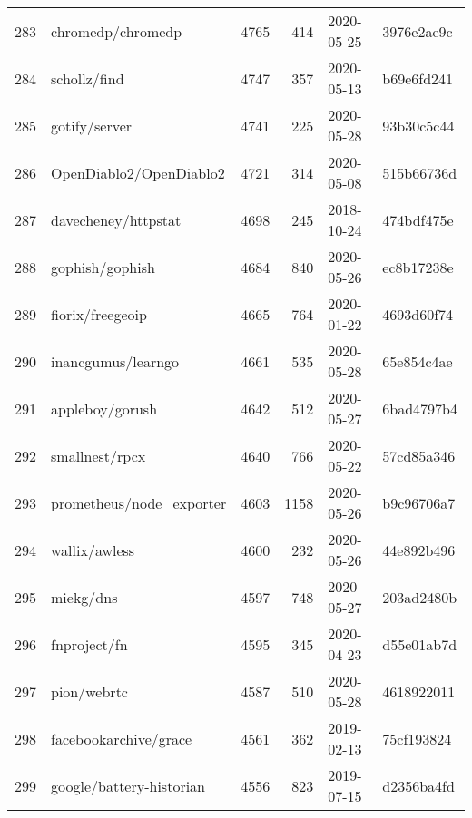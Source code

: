 \begin{footnotesize}
\begin{longtable}{llrrll}
        283 &                                  chromedp/chromedp &   4765 &    414 & 2020-05-25 &  3976e2ae9c \\
        284 &                                       schollz/find &   4747 &    357 & 2020-05-13 &  b69e6fd241 \\
        285 &                                      gotify/server &   4741 &    225 & 2020-05-28 &  93b30c5c44 \\
        286 &                            OpenDiablo2/OpenDiablo2 &   4721 &    314 & 2020-05-08 &  515b66736d \\
        287 &                                davecheney/httpstat &   4698 &    245 & 2018-10-24 &  474bdf475e \\
        288 &                                    gophish/gophish &   4684 &    840 & 2020-05-26 &  ec8b17238e \\
        289 &                                   fiorix/freegeoip &   4665 &    764 & 2020-01-22 &  4693d60f74 \\
        290 &                                 inancgumus/learngo &   4661 &    535 & 2020-05-28 &  65e854c4ae \\
        291 &                                    appleboy/gorush &   4642 &    512 & 2020-05-27 &  6bad4797b4 \\
        292 &                                     smallnest/rpcx &   4640 &    766 & 2020-05-22 &  57cd85a346 \\
        293 &                           prometheus/node\_exporter &   4603 &   1158 & 2020-05-26 &  b9c96706a7 \\
        294 &                                      wallix/awless &   4600 &    232 & 2020-05-26 &  44e892b496 \\
        295 &                                          miekg/dns &   4597 &    748 & 2020-05-27 &  203ad2480b \\
        296 &                                       fnproject/fn &   4595 &    345 & 2020-04-23 &  d55e01ab7d \\
        297 &                                        pion/webrtc &   4587 &    510 & 2020-05-28 &  4618922011 \\
        298 &                              facebookarchive/grace &   4561 &    362 & 2019-02-13 &  75cf193824 \\
        299 &                           google/battery-historian &   4556 &    823 & 2019-07-15 &  d2356ba4fd \\

\end{longtable}
\end{footnotesize}
